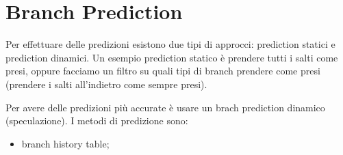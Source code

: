 \documentclass[12pt]{article}
\begin{document}
\newpage
\section{Branch Prediction}
Per effettuare delle predizioni esistono due tipi di approcci: prediction statici e prediction dinamici. Un esempio prediction statico \`e prendere tutti i salti come presi, oppure facciamo un filtro su quali tipi di branch prendere come presi (prendere i salti all'indietro come sempre presi).

Per avere delle predizioni pi\`u accurate \`e usare un brach prediction dinamico (speculazione). I metodi di predizione sono:
\begin{itemize}
    \item branch history table;
\end{itemize}
\end{document}
